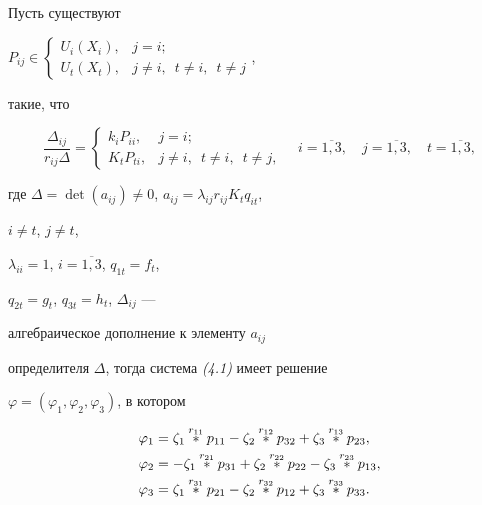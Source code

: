 \begin{thm}


Пусть существуют


$P_{ij}\in


\begin{cases}


U_i(X_i),& j=i;\\


U_t(X_t),& j\ne i,\ \;t\ne i,\ \;t\ne j


\end{cases}


$,


такие, что


$$\frac{\Delta_{ij}}{r_{ij}\Delta}=


\begin{cases}


k_iP_{ii},& j=i;\\


K_tP_{ti},& j\ne i,\ \;t\ne i,\ \;t\ne j,


\end{cases}


\quad i=\overline{1,3},\quad j=\overline{1,3},\quad t=\overline{1,3},


$$


где $\Delta=\det(a_{ij})\ne 0$, $a_{ij}=\lambda_{ij}r_{ij}K_tq_{it}$,


$i\ne t$, $j\ne t$,


$\lambda_{ii}=1$, $i=\overline{1,3}$, $q_{1t}=f_t$,


$q_{2t}=g_t$, $q_{3t}=h_t$, $\Delta_{ij}$ ---


алгебраическое дополнение к элементу $a_{ij}$


определителя $\Delta$, тогда система {\em (4.1)} имеет решение


$\varphi=(\varphi_1,\varphi_2,\varphi_3)$, в котором


\begin{align*}


\varphi_1&=\zeta_1\up{r_{11}}{}p_{11}-


\zeta_2\up{r_{12}}{}p_{32}+\zeta_3\up{r_{13}}{}p_{23},\\


\varphi_2&=-\zeta_1\up{r_{21}}{}p_{31}+


\zeta_2\up{r_{22}}{}p_{22}-\zeta_3\up{r_{23}}{}p_{13},\\


\varphi_3&=\zeta_1\up{r_{31}}{}p_{21}-


\zeta_2\up{r_{32}}{}p_{12}+\zeta_3\up{r_{33}}{}p_{33}.


\end{align*}


\end{thm}





